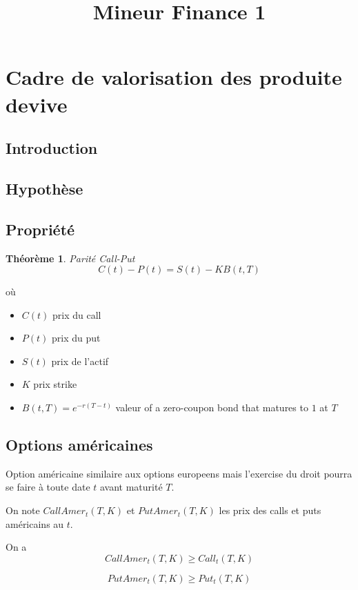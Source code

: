 \documentclass{article}
\title{Mineur Finance 1}
\theoremstyle{plain}
\newtheorem{thm}{Th\'eor\`eme}[section]
\theoremstyle{definition}
\begin{document}
\maketitle

\tableofcontents
\pagebreak

\section{Cadre de valorisation des produite devive}
\subsection{Introduction}
\subsection{Hypoth\`ese}
\subsection{Propri\'et\'e}
\begin{thm}
	Parit\'e Call-Put
	\begin{equation}
		C(t) - P(t) = S(t)-KB(t,T)
	\end{equation}
\end{thm}
o\`u
\begin{itemize}
	\item $C(t)$ prix du call
	\item $P(t)$ prix du put
	\item $S(t)$ prix de l'actif
	\item $K$ prix strike
	\item $B(t,T)=e^{-r(T-t)}$ valeur of a zero-coupon bond that matures to $1$ at  $T$
\end{itemize}
	
\subsection{Options am\'ericaines}
Option am\'ericaine similaire aux options europeens mais l'exercise du droit pourra se faire \`a toute date $t$ avant maturit\'e $T$.

On note $CallAmer_t(T, K)$ et $PutAmer_t(T, K)$ les prix des calls et puts am\'ericains au $t$.

On a 
\begin{equation}
CallAmer_t(T,K) \geq Call_t(T, K)
\end{equation}
 
\begin{equation}
PutAmer_t(T, K) \geq Put_t(T, K)
\end{equation}
\end{document}

